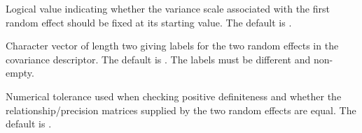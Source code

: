 \documentclass[a4paper]{book}
\begin{document}
\begin{Arguments}
\begin{ldescription}
\item[\code{fixedSigma2}] 
Logical value indicating whether the variance scale associated with
the first random effect should be fixed at its starting value.
The default is .


\item[\code{labels}] 
Character vector of length two giving labels for the two random
effects in the covariance descriptor. The default is
. The labels must be different and non-empty.


\item[\code{tol}] 
Numerical tolerance used when checking positive definiteness and
whether the relationship/precision matrices supplied by the two
random effects are equal. The default is .

\end{ldescription}
\end{Arguments}
%
\end{document}

